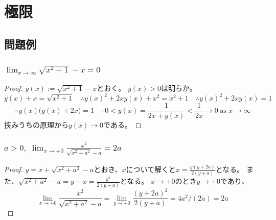 \chapter{極限}
    \section{問題例}
        \subsection{\texorpdfstring{$\lim_{x\to\infty} \sqrt{x^2+1} - x = 0$}{√(x\string^2+1)-x → 0 as x→∞}}
            \begin{proof}
                \quad\par
                $y(x) := \sqrt{x^2+1} - x$とおく。
                $y(x) > 0$は明らか。
                \[ y(x)+x = \sqrt{x^2+1} \quad \therefore y(x)^2 + 2xy(x) + x^2 = x^2 + 1 \quad \therefore y(x)^2 + 2xy(x) = 1 \]
                \[ \therefore y(x)\bigl(y(x) + 2x\bigr) = 1 \quad \therefore 0 < y(x) = \frac{1}{2x + y(x)} < \frac{1}{2x} \to 0\;\text{as}\;x\to\infty \]
                挟みうちの原理から$y(x) \to 0$である。
            \end{proof}
        \subsection{\texorpdfstring{$a>0,\;\lim_{x\to+0}\frac{x^2}{\sqrt{x^2+a^2}-a} = 2a$}{x\string^2/(√(x\string^2+a\string^2)-a) → 2a as x → +0}}
            \begin{proof}
                \quad\par
                $y = x + \sqrt{x^2+a^2} - a$とおき、$x$について解くと$x = \frac{y(y+2a)}{2(y+a)}$となる。
                また、$\sqrt{x^2+a^2}-a = y - x = \frac{y^2}{2(y+a)}$となる。
                $x\to+0$のとき$y\to+0$であり、
                \[ \lim_{x\to+0}\frac{x^2}{\sqrt{x^2+a^2}-a} = \lim_{y\to+0} \frac{(y+2a)^2}{2(y+a)} = 4a^2/(2a) = 2a \]
            \end{proof}